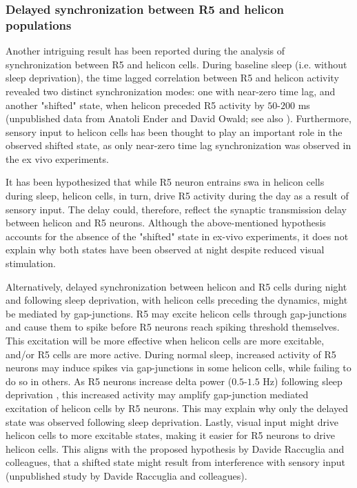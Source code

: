 \documentclass[../main.tex]{subfiles}
\begin{document}
\subsubsection{Delayed synchronization between R5 and helicon populations}\label{subsubsec:delayed_synch_r5_helicon}

Another intriguing result has been reported during the analysis of synchronization between R5 and helicon cells. During baseline sleep (i.e. without sleep deprivation), the time lagged correlation between R5 and helicon activity revealed two distinct synchronization modes: one with near-zero time lag, and another "shifted" state, when helicon preceded R5 activity by $50$-$200$ ms (unpublished data from Anatoli Ender and David Owald; see also \parencite{krummSlowlyOscillatingBrain2021}).
Furthermore, sensory input to helicon cells has been thought to play an important role in the observed shifted state, as only near-zero time lag synchronization was observed in the ex vivo experiments.

It has been hypothesized that while R5 neuron entrains \gls{swa} in helicon cells during sleep, helicon cells, in turn, drive R5 activity during the day as a result of sensory input. The delay could, therefore, reflect the synaptic transmission delay between helicon and R5 neurons. Although the above-mentioned hypothesis accounts for the absence of the "shifted" state in ex-vivo experiments, it does not explain why both states have been observed at night despite reduced visual stimulation.

Alternatively, delayed synchronization between helicon and R5 cells during night and following sleep deprivation, with helicon cells preceding the dynamics, might be mediated by gap-junctions.
R5 may excite helicon cells through gap-junctions and cause them to spike before R5 neurons reach spiking threshold themselves. This excitation will be more effective when helicon cells are more excitable, and/or R5 cells are more active.
During normal sleep, increased activity of R5 neurons may induce spikes via gap-junctions in some helicon cells, while failing to do so in others. As R5 neurons increase delta power ($0.5$-$1.5$ Hz) following sleep deprivation \parencite{raccugliaNetworkSpecificSynchronizationElectrical2019}, this increased activity may amplify gap-junction mediated excitation of helicon cells by R5 neurons. This may explain why only the delayed state was observed following sleep deprivation. Lastly, visual input might drive helicon cells to more excitable states, making it easier for R5 neurons to drive helicon cells. This aligns with the proposed hypothesis by Davide Raccuglia and colleagues, that a shifted state might result from interference with sensory input (unpublished study by Davide Raccuglia and colleagues).
\end{document}
